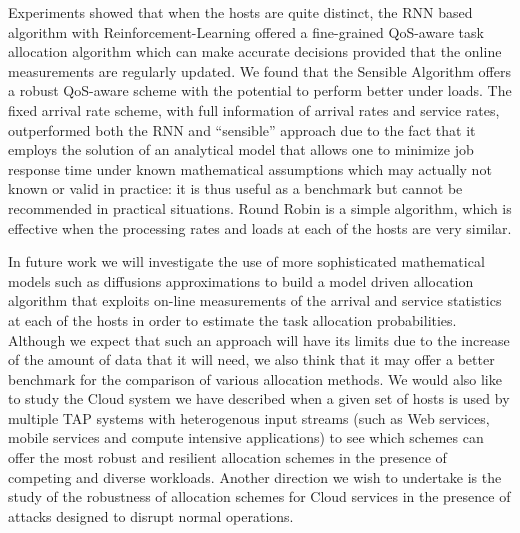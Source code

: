 \documentclass[journal]{IEEEtran}
\begin{document}
Experiments showed that when the hosts are quite distinct, the RNN based algorithm with Reinforcement-Learning offered a fine-grained QoS-aware task allocation algorithm which can make accurate decisions provided that the online measurements are regularly updated. We found that the Sensible Algorithm offers a robust QoS-aware scheme with the potential to perform better under loads. The fixed arrival
rate scheme, with full information of arrival rates and service rates,  outperformed both the RNN and ``sensible'' approach  due to the fact that it employs the solution of an analytical model 
that allows one to minimize job response time under known mathematical assumptions which may actually not known or valid in practice: it is thus useful as a benchmark but cannot be recommended in practical situations. Round Robin is a simple algorithm, which is effective when the processing rates and loads at each of the hosts are very similar. 
	
In future work we will investigate the use of more sophisticated mathematical models such as diffusions approximations \cite{Diffusion} to build a model driven allocation algorithm that exploits on-line measurements of the arrival and service statistics at each of the hosts in order to estimate the task allocation probabilities. Although we expect that such an approach will have its limits due to the increase of the
amount of data that it will need, we also think that it may offer a better benchmark for the comparison of various allocation methods. We would also like to study the Cloud system we have described when a given set of hosts
is used by multiple TAP systems with heterogenous input streams (such as Web services, mobile services and compute intensive applications) to see which schemes can offer the most robust and resilient
allocation schemes in the presence of competing and diverse workloads. Another direction we wish to undertake is the study of the robustness of allocation schemes
for Cloud services in the presence of attacks \cite{DDoS} designed to disrupt normal operations.













\end{document}
